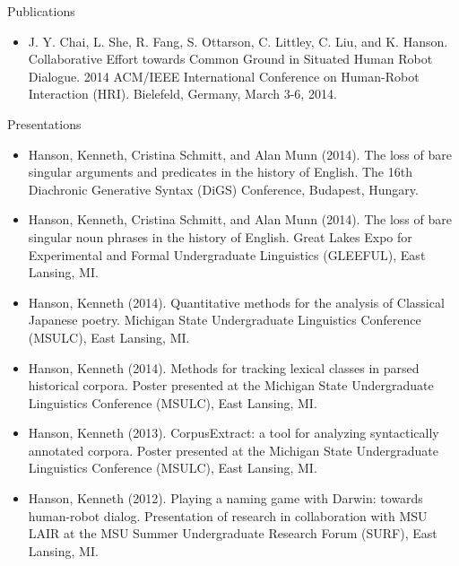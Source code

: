 \documentclass[10pt,oneside]{article}
\newenvironment{ressection}[1]{
	{\Large#1}
	\begin{itemize}
}{
	\end{itemize}
}
\begin{document}
\begin{ressection}{Publications}
	\item{J. Y. Chai, L. She, R. Fang, S. Ottarson, C. Littley, C. Liu, and K. Hanson. Collaborative Effort towards Common Ground in Situated Human Robot Dialogue. 2014 ACM/IEEE International Conference on Human-Robot Interaction (HRI). Bielefeld, Germany, March 3-6, 2014.}
\end{ressection}


\begin{ressection}{Presentations}
	\item{Hanson, Kenneth, Cristina Schmitt, and Alan Munn (2014). The loss of bare singular arguments and predicates in the history of English. The 16th Diachronic Generative Syntax (DiGS) Conference, Budapest, Hungary.}
	
	\item{Hanson, Kenneth, Cristina Schmitt, and Alan Munn (2014). The loss of bare singular noun phrases in the history of English. Great Lakes Expo for Experimental and Formal Undergraduate Linguistics (GLEEFUL), East Lansing, MI.}
	
	\item{Hanson, Kenneth (2014). Quantitative methods for the analysis of Classical Japanese poetry. Michigan State Undergraduate Linguistics Conference (MSULC), East Lansing, MI.}
	
	\item{Hanson, Kenneth (2014). Methods for tracking lexical classes in parsed historical corpora. Poster presented at the Michigan State Undergraduate Linguistics Conference (MSULC), East Lansing, MI.}
	
    \item{Hanson, Kenneth (2013). CorpusExtract: a tool for analyzing syntactically annotated corpora. Poster presented at the Michigan State Undergraduate Linguistics Conference (MSULC), East Lansing, MI.}
    
    \item{Hanson, Kenneth (2012). Playing a naming game with Darwin: towards human-robot dialog. Presentation of research in collaboration with MSU LAIR at the MSU Summer Undergraduate Research Forum (SURF), East Lansing, MI.}
\end{ressection}
\end{document}
